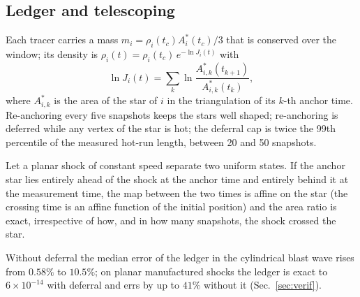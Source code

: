\documentclass[11pt]{article}
\theoremstyle{definition}\newtheorem{definition}{Definition}\theoremstyle{remark}\newtheorem{remark}{Remark}
\begin{document}
\subsection{Ledger and telescoping}
Each tracer carries a mass $m_i=\rho_i(t_c)A^\ast_i(t_c)/3$ that is conserved over the window; its density is $\rho_i(t)=\rho_i(t_c)\,e^{-\ln J_i(t)}$ with
\begin{equation}
\ln J_i(t)=\sum_k\ln\frac{A^\ast_{i,k}(t_{k+1})}{A^\ast_{i,k}(t_k)},
\end{equation}
where $A^\ast_{i,k}$ is the area of the star of $i$ in the triangulation of its $k$-th anchor time. Re-anchoring every five snapshots keeps the stars well shaped; re-anchoring is deferred while any vertex of the star is hot; the deferral cap is twice the 99th percentile of the measured hot-run length, between 20 and 50 snapshots.
\begin{proposition}
Let a planar shock of constant speed separate two uniform states. If the anchor star lies entirely ahead of the shock at the anchor time and entirely behind it at the measurement time, the map between the two times is affine on the star (the crossing time is an affine function of the initial position) and the area ratio is exact, irrespective of how, and in how many snapshots, the shock crossed the star.
\end{proposition}
Without deferral the median error of the ledger in the cylindrical blast wave rises from $0.58\%$ to $10.5\%$; on planar manufactured shocks the ledger is exact to $6\times10^{-14}$ with deferral and errs by up to $41\%$ without it (Sec.~\ref{sec:verif}).
\end{document}
